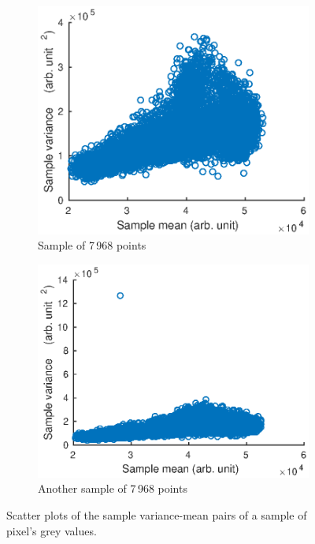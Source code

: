 \documentclass[12pt]{report}
\begin{document}
\begin{figure}
	\centering
	\begin{subfigure}[b]{0.45\textwidth}
		\includegraphics[width=1\textwidth]{figures/meanVar/scatter1.eps}
		\caption{Sample of 7\,968 points}
	\end{subfigure}
	\begin{subfigure}[b]{0.45\textwidth}
		\includegraphics[width=1\textwidth]{figures/meanVar/scatter2.eps}
		\caption{Another sample of 7\,968 points}
	\end{subfigure}
	\caption{Scatter plots of the sample variance-mean pairs of a sample of pixel's grey values.}
	\label{fig:scatterMeanVar}
\end{figure}
\end{document}
